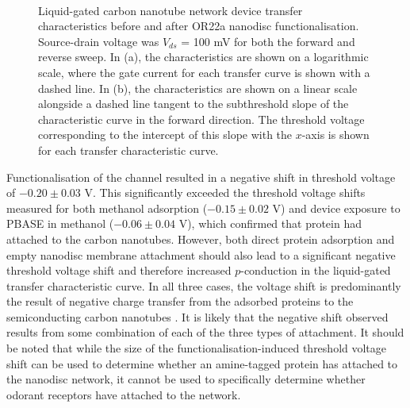 \documentclass[
  a4paper,
]{scrbook}
\begin{document}
\begin{figure}
\begin{minipage}[t]{0.45\linewidth}
{{}

}

\end{minipage}%
%
\begin{minipage}[t]{0.01\linewidth}

{\centering 

~

}

\end{minipage}%

\caption[Liquid-gated carbon nanotube network device transfer
characteristics before and after successful OR22a nanodisc
functionalisation.]{\label{fig-OR22a-TX-comparison}Liquid-gated carbon
nanotube network device transfer characteristics before and after OR22a
nanodisc functionalisation. Source-drain voltage was \(V_{ds}\) = 100 mV
for both the forward and reverse sweep. In (a), the characteristics are
shown on a logarithmic scale, where the gate current for each transfer
curve is shown with a dashed line. In (b), the characteristics are shown
on a linear scale alongside a dashed line tangent to the subthreshold
slope of the characteristic curve in the forward direction. The
threshold voltage corresponding to the intercept of this slope with the
\(x\)-axis is shown for each transfer characteristic curve.}

\end{figure}

Functionalisation of the channel resulted in a negative shift in
threshold voltage of \(-0.20 \pm 0.03\) V. This significantly exceeded
the threshold voltage shifts measured for both methanol adsorption
(\(-0.15 \pm 0.02\) V) and device exposure to PBASE in methanol
(\(-0.06 \pm 0.04\) V), which confirmed that protein had attached to the
carbon nanotubes. However, both direct protein adsorption
\autocite{Bradley2004,Heller2008,Kauffman2008} and empty nanodisc
membrane attachment \autocite{Murugathas2019a} should also lead to a
significant negative threshold voltage shift and therefore increased
\(p\)-conduction in the liquid-gated transfer characteristic curve. In
all three cases, the voltage shift is predominantly the result of
negative charge transfer from the adsorbed proteins to the
semiconducting carbon nanotubes
\autocite{Bradley2004,Heller2008,Murugathas2019a}. It is likely that the
negative shift observed results from some combination of each of the
three types of attachment. It should be noted that while the size of the
functionalisation-induced threshold voltage shift can be used to
determine whether an amine-tagged protein has attached to the nanodisc
network, it cannot be used to specifically determine whether odorant
receptors have attached to the network.
\end{document}
